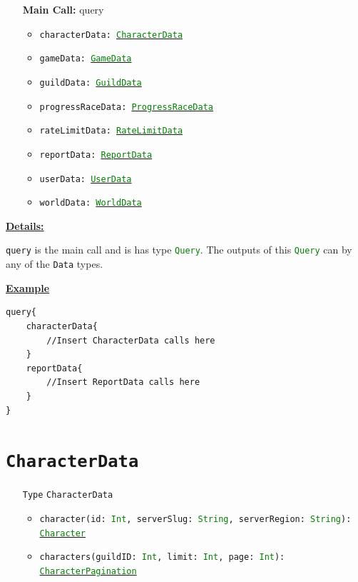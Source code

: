 \documentclass[10pt, a4paper]{memoir}
\numberwithin{equation}{section}
\theoremstyle{plain}
\theoremstyle{defp}
\theoremstyle{dotless}
\theoremstyle{definition}
\theoremstyle{dotless}
\theoremstyle{dotless}
\theoremstyle{defp}
\theoremstyle{defp}
\theoremstyle{be}          %
\theoremstyle{defp}
\newcommand\ttt[1]{\texttt{#1}}
\newcommand\type[1]{\ttt{\textcolor{green}{#1}}}
\begin{document}
\begin{itemize}[noitemsep,topsep=1pt]
\item[\textbf{Main Call:}] query
	\begin{itemize}[noitemsep,topsep=1pt]
		\item \ttt{characterData: \hyperref[sec:CharacterData]{\type{CharacterData}}}
		\item \ttt{gameData: \hyperref[sec:GameData]{\type{GameData}}}
		\item \ttt{guildData: \hyperref[sec:GuildData]{\type{GuildData}}}
		\item \ttt{progressRaceData: \hyperref[sec:ProgressRaceData]{\type{ProgressRaceData}}}
		\item \ttt{rateLimitData: \hyperref[sec:RateLimitData]{\type{RateLimitData}}}
		\item \ttt{reportData: \hyperref[sec:ReportData]{\type{ReportData}}}
		\item \ttt{userData: \hyperref[sec:UserData]{\type{UserData}}}
		\item \ttt{worldData: \hyperref[sec:WorldData]{\type{WorldData}}}
	\end{itemize}
\end{itemize}

\underline{\textbf{Details:}}

\ttt{query} is the main call and is has type \type{Query}. The outputs of this \type{Query} can by any of the \ttt{Data} types. 

\underline{\textbf{Example}}

\begin{lstlisting}[language=WowAPI]
query{
	characterData{
		//Insert CharacterData calls here
	}
	reportData{
		//Insert ReportData calls here
	}
}
\end{lstlisting}


\newpage

\section{\ttt{CharacterData}}\label{sec:CharacterData}

\begin{itemize}[noitemsep,topsep=1pt]
\item[\ttt{Type}] \ttt{CharacterData}
\begin{itemize}[itemsep=1pt,topsep=1pt]
\item \ttt{character(id: \type{Int}, serverSlug: \type{String}, serverRegion: \type{String}): \hyperref[sec:Character]{\type{Character}}}
\item \ttt{characters(guildID: \type{Int}, limit: \type{Int}, page: \type{Int}): \hyperref[sec:characterpagination]{\type{CharacterPagination}}}
\end{itemize}
\end{itemize}
\end{document}
